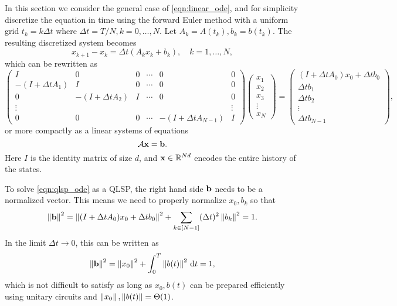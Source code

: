 In this section we consider the general case of \cref{eqn:linear_ode}, and for simplicity discretize the equation in time using the forward Euler method with a uniform grid $t_k=k\Delta t$ where $\Delta t=T/N,k=0,\ldots,N$. Let $A_k=A(t_k), b_k=b(t_k)$.
The resulting discretized system becomes
\begin{equation}
x_{k+1}-x_k=\Delta t(A_k x_k+b_k), \quad k=1,\ldots,N,
\end{equation}
which can be rewritten as
\begin{equation}
\begin{pmatrix}
I & 0 & 0 & \cdots & 0 & 0\\
-(I+\Delta t A_1) & I & 0 & \cdots & 0 & 0\\
0 & -(I+\Delta t A_2) & I & \cdots & 0 & 0\\
\vdots & & & & &\vdots\\
0& 0 & 0 & \cdots & -(I+\Delta t A_{N-1}) & I
\end{pmatrix}
\begin{pmatrix}
x_1\\
x_2\\
x_3\\
\vdots\\
x_{N}
\end{pmatrix}
=
\begin{pmatrix}
(I+\Delta t A_0)x_0+\Delta t b_0\\
\Delta t b_1\\
\Delta t b_2\\
\vdots\\
\Delta t b_{N-1}
\end{pmatrix},
\label{eqn:qlsp_ode}
\end{equation}
or more compactly as a linear systems of equations
\begin{equation}
\mathcal{A} \mathbf{x}=\mathbf{b}.
\end{equation}
Here $I$ is the identity matrix of size $d$, and $\mathbf{x}\in\mathbb{R}^{Nd}$ encodes the entire history of the states.

To solve \cref{eqn:qlsp_ode} as a QLSP, the right hand side $\mathbf{b}$ needs to be a normalized vector. This means we need to properly normalize $x_0,b_k$ so that
\begin{equation}
\left\lVert\mathbf{b}\right\rVert^2=\left\lVert(I+\Delta t A_0)x_0+\Delta t b_0\right\rVert^2+\sum_{k\in[N-1]} (\Delta t)^2\left\lVert b_k\right\rVert^2=1.
\end{equation}
In the limit $\Delta t \to 0$, this can be written as
\begin{equation}
\left\lVert\mathbf{b}\right\rVert^2=\left\lVert x_0\right\rVert^2+\int_{0}^T \left\lVert b(t)\right\rVert^2\,\mathrm{d} t=1,
\end{equation}
which is not difficult to satisfy as long as $x_0,b(t)$ can be prepared efficiently using unitary circuits and $\left\lVert x_0\right\rVert,\left\lVert b(t)\right\rVert=\Theta(1)$.

